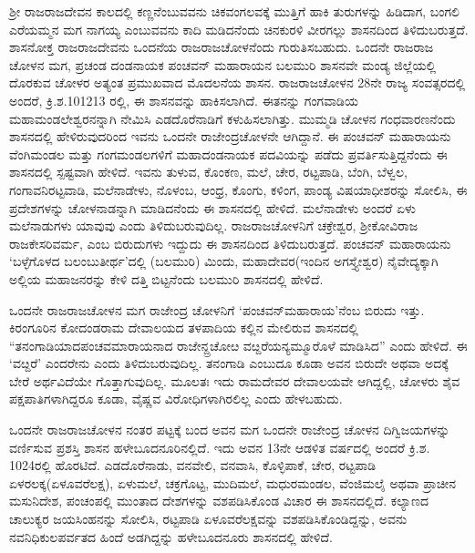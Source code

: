 ಶ‍್ರೀ ರಾಜರಾಜದೇವನ ಕಾಲದಲ್ಲಿ ಕಣ್ಣನೆಂಬುವವನು ಚಿಕವಂಗಲವಕ್ಕೆ ಮುತ್ತಿಗೆ ಹಾಕಿ ತುರುಗಳನ್ನು ಹಿಡಿದಾಗ, ಬಂಗಲಿ ಎರೆಯಮ್ಮನ ಮಗ ನಾಗಯ್ಯ ಎಂಬುವವನು ಕಾದಿ ಮಡಿದನೆಂದು ಚಿನಕುರಳಿ ವೀರಗಲ್ಲು ಶಾಸನದಿಂದ ತಿಳಿದುಬರುತ್ತದೆ. ಶಾಸನೋಕ್ತ ರಾಜರಾಜದೇವನು ಒಂದನೆಯ ರಾಜರಾಜಚೋಳನೆಂದು ಗುರುತಿಸಬಹುದು. ಒಂದನೇ ರಾಜರಾಜ ಚೋಳನ ಮಗ, ಪ್ರಚಂಡ ದಂಡನಾಯಕ ಪಂಚವನ್​ ಮಹಾರಾಯನ ಬಲಮುರಿ ಶಾಸನವೇ ಮಂಡ್ಯ ಜಿಲ್ಲೆಯಲ್ಲಿ ದೊರಕುವ ಚೋಳರ ಅತ್ಯಂತ ಪ್ರಮುಖವಾದ ಮೊದಲನೆಯ ಶಾಸನ. ರಾಜರಾಜಚೋಳನ 28ನೇ ರಾಜ್ಯ ಸಂವತ್ಸರದಲ್ಲಿ ಅಂದರೆ, ಕ್ರಿ.ಶ.101213 ರಲ್ಲಿ, ಈ ಶಾಸನವನ್ನು ಹಾಕಿಸಲಾಗಿದೆ. ಈತನನ್ನು ಗಂಗವಾಡಿಯ ಮಹಾಮಂಡಲೇಶ್ವರನನ್ನಾಗಿ ನೇಮಿಸಿ ಎಡದೊರೆನಾಡಿಗೆ ಕಳುಹಿಸಲಾಗಿತ್ತು. ಮುಮ್ಮಡಿ ಚೋಳನ ಗಂಧವಾರಣನೆಂದು ಶಾಸನದಲ್ಲಿ ಹೇಳಿರುವುದರಿಂದ ಇವನು ಒಂದನೇ ರಾಜೇಂದ್ರಚೋಳನೇ ಆಗಿದ್ದಾನೆ. ಈ ಪಂಚವನ್​ ಮಹಾರಾಯನು ವೆಂಗಿಮಂಡಲ ಮತ್ತು ಗಂಗಮಂಡಲಗಳಿಗೆ ಮಹಾದಂಡನಾಯಕ ಪದವಿಯನ್ನು ಪಡೆದು ಪ್ರವರ್ತಿಸುತ್ತಿದ್ದನೆಂದು ಈ ಶಾಸನದಲ್ಲಿ ಸ್ಪಷ್ಟವಾಗಿ ಹೇಳಿದೆ. ಇವನು ತುಳುವ, ಕೊಂಕಣ, ಮಲೆ, ಚೇರ, ರಟ್ಟಪಾಡಿ, ಬೆಂಗಿ, ಬೆಳ್ವಲ, ಗಂಗಾವನಿರಟ್ಟವಾಡಿ, ಮಲೆನಾಡೇಳು, ನೊಳಂಬ, ಆಂಧ್ರ, ಕೊಂಗು, ಕಳಿಂಗ, ಪಾಂಡ್ಯ ವಿಷಯಾಧೀಶರನ್ನು ಸೋಲಿಸಿ, ಈ ಪ್ರದೇಶಗಳನ್ನು ಚೋಳನಾಡನ್ನಾಗಿ ಮಾಡಿದನೆಂದು ಈ ಶಾಸನದಲ್ಲಿ ಹೇಳಿದೆ. ಮಲೆನಾಡೇಳು ಅಂದರೆ ಏಳು ಮಲೆನಾಡುಗಳು ಯಾವುವು ಎಂದು ತಿಳಿದುಬರುವುದಿಲ್ಲ. ರಾಜರಾಜಚೋಳನಿಗೆ ಚಕ್ರೇಶ್ವರ, ಶ‍್ರೀಕೋವಿರಾಜ ರಾಜಕೇಸರಿವರ್ಮ, ಎಂಬ ಬಿರುದುಗಳು ಇದ್ದುದು ಈ ಶಾಸನದಿಂದ ತಿಳಿದುಬರುತ್ತದೆ. ಪಂಚವನ್​ ಮಹಾರಾಯನು ‘ಬಳ್ಳೆಗೊಳದ ಬಲಂಬುತೀರ್ಥ’ದಲ್ಲಿ (ಬಲಮುರಿ) ಮಿಂದು, ಮಹಾದೇವರ(ಇಂದಿನ ಅಗಸ್ತ್ಯೇಶ್ವರ) ನೈವೇದ್ಯ\-ಕ್ಕಾಗಿ ಅಲ್ಲಿಯ ಮಹಾಜನರನ್ನು ಕೇಳಿ ದತ್ತಿ ಬಿಟ್ಟನೆಂದು ಬಲಮುರಿ ಶಾಸನದಲ್ಲಿ ಹೇಳಿದೆ. 

ಒಂದನೇ ರಾಜರಾಜಚೋಳನ ಮಗ ರಾಜೇಂದ್ರ ಚೋಳನಿಗೆ ‘ಪಂಚವನ್​ಮಹಾರಾಯ’ನೆಂಬ ಬಿರುದು ಇತ್ತು. ಕಿರಂಗೂರಿನ ಕೋದಂಡರಾಮ ದೇವಾಲಯದ ತಳಪಾದಿಯ ಕಲ್ಲಿನ ಮೇಲಿರುವ ಶಾಸನದಲ್ಲಿ “ತನಂಗಾಡಿಯಾದ\break ಪಂಚವಮಾರಾಯನಾದ ರಾಜೇನ್ದ್ರಚೋೞ ವೞ್ದರೆಯನ್ಯಮ್ಮೂರೊಳೆ ಮಾಡಿಸಿದ” ಎಂದು ಹೇಳಿದೆ. ಈ ‘ವೞ್ದರೆ’ ಎಂದರೇನು ಎಂದು ತಿಳಿದುಬರುವುದಿಲ್ಲ. ತನಂಗಾಡಿ ಎಂಬುದೂ ಕೂಡಾ ಅವನ ಬಿರುದೇ ಅಥವಾ ಅದಕ್ಕೆ ಬೇರೆ ಅರ್ಥವಿದೆಯೇ ಗೊತ್ತಾಗುವುದಿಲ್ಲ. ಮೂಲತಃ ಇದು ರಾಮದೇವರ ದೇವಾಲಯವೇ ಆಗಿದ್ದಲ್ಲಿ, ಚೋಳರು ಶೈವ ಪಕ್ಷಪಾತಿಗಳಾಗಿದ್ದರೂ ಕೂಡಾ, ವೈಷ್ಣವ ವಿರೋಧಿಗಳಾಗಿರಲಿಲ್ಲ ಎಂದು ಹೇಳಬಹುದು.

ಒಂದನೇ ರಾಜರಾಜಚೋಳನ ನಂತರ ಪಟ್ಟಕ್ಕೆ ಬಂದ ಅವನ ಮಗ ಒಂದನೇ ರಾಜೇಂದ್ರ ಚೋಳನ ದಿಗ್ವಿಜಯಗಳನ್ನು ವರ್ಣಿಸುವ ಪ್ರಶಸ್ತಿ ಶಾಸನ ಹಳೇಬೂದನೂರಿನಲ್ಲಿದೆ. ಇದು ಅವನ 13ನೇ ಆಡಳಿತ ವರ್ಷದಲ್ಲಿ ಅಂದರೆ ಕ್ರಿ.ಶ. 1024ರಲ್ಲಿ ಹೊರಟಿದೆ. ಎಡದೊರೆನಾಡು, ವನವೇಲಿ, ವನವಾಸಿ, ಕೊಳ್ಳಿಪಾಕೆ, ಚೇರ, ರಟ್ಟಪಾಡಿ ಏಳರಲಕ್ಕ(ಏಳೂವರೆಲಕ್ಷ), ಏಳುಮಲೆ, ಚಕ್ರಗೊಟ್ಟ, ಮುದಿಮಲೆ, ಮಧುರಮಂಡಲ, ವೆಂಜಿಮಲೈ ಅಥವಾ ಪ್ರಾಚೀನ ಮಸುನಿದೇಶ, ಪಂಚಂಪಲ್ಲಿ ಮುಂತಾದ ದೇಶಗಳನ್ನು ವಶಪಡಿಸಿಕೊಂಡ ವಿಚಾರ ಈ ಶಾಸನದಲ್ಲಿದೆ. ಕಲ್ಯಾಣದ ಚಾಲುಕ್ಯರ ಜಯಸಿಂಹನನ್ನು ಸೋಲಿಸಿ, ರಟ್ಟಪಾಡಿ ಏಳೂವರೆಲಕ್ಷವನ್ನು ವಶಪಡಿಸಿಕೊಂಡಿದ್ದನ್ನು, ಅವನು ನವನಿಧಿಕುಲಪರ್ವತದ ಹಿಂದೆ ಅಡಗಿದ್ದನ್ನು ಹಳೇಬೂದನೂರು ಶಾಸನದಲ್ಲಿ ಹೇಳಿದೆ.

